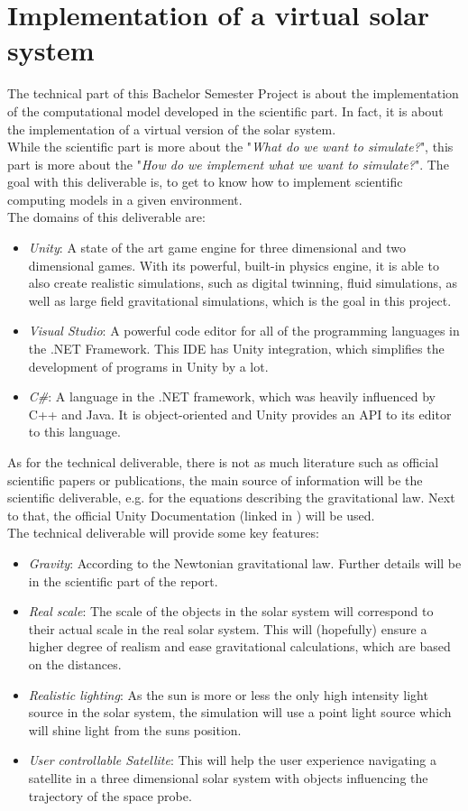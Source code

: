 \documentclass[conference,compsoc]{IEEEtran}
\begin{document}
\section{ Implementation of a virtual solar system }
The technical part of this Bachelor Semester Project is about the implementation of the computational model developed in the scientific part. In fact, it is about the implementation of a virtual version of the solar system. \\
While the scientific part is more about the "\emph{What do we want to simulate?}", this part is more about the "\emph{How do we implement what we want to simulate?}". The goal with this deliverable is, to get to know how to implement scientific computing models in a given environment. \\
The domains of this deliverable are:
\begin{itemize}
	\item \emph{Unity}: A state of the art game engine for three dimensional and two dimensional games. With its powerful, built-in physics engine, it is able to also create realistic simulations, such as digital twinning, fluid simulations, as well as large field gravitational simulations, which is the goal in this project.
	\item \emph{Visual Studio}: A powerful code editor for all of the programming languages in the .NET Framework. This IDE has Unity integration, which simplifies the development of programs in Unity by a lot. 
	\item \emph{C\#}: A language in the .NET framework, which was heavily influenced by C++ and Java. It is object-oriented and Unity provides an API to its editor to this language. 
\end{itemize} 
As for the technical deliverable, there is not as much literature such as official scientific papers or publications, the main source of information will be the scientific deliverable, e.g. for the equations describing the gravitational law. Next to that, the official Unity Documentation (linked in \cite{UnityDoc}) will be used. \\ 
The technical deliverable will provide some key features:
\begin{itemize}
	\item \emph{Gravity}: According to the Newtonian gravitational law. Further details will be in the scientific part of the report.
	\item \emph{Real scale}: The scale of the objects in the solar system will correspond to their actual scale in the real solar system. This will (hopefully) ensure a higher degree of realism and ease gravitational calculations, which are based on the distances.
	\item \emph{Realistic lighting}: As the sun is more or less the only high intensity light source in the solar system, the simulation will use a point light source which will shine light from the suns position. 
	\item \emph{User controllable Satellite}: This will help the user experience navigating a satellite in a three dimensional solar system with objects influencing the trajectory of the space probe.
\end{itemize}
\end{document}

